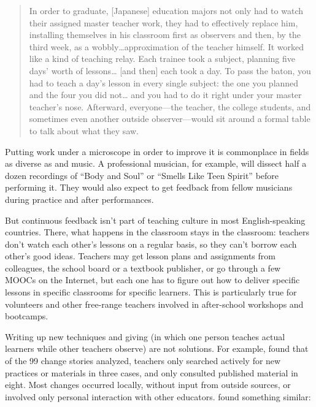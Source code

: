 \begin{quote}

  In order to graduate,
  [Japanese] education majors not only had to watch their assigned master teacher work,
  they had to effectively replace him,
  installing themselves in his classroom first as observers and then,
  by the third week,
  as a wobbly{\ldots}approximation of the teacher himself.
  It worked like a kind of teaching relay.
  Each trainee took a subject,
  planning five days' worth of lessons{\ldots} [and then] each took a day.
  To pass the baton,
  you had to teach a day's lesson in every single subject:
  the one you planned and the four you did not{\ldots}
  and you had to do it right under your master teacher's nose.
  Afterward, everyone---the teacher, the college students,
  and sometimes even another outside observer---would sit around a formal table
  to talk about what they saw.

\end{quote}

Putting work under a microscope in order to improve it is commonplace
in fields as diverse as  and music.
A professional musician,
for example,
will dissect half a dozen recordings of ``Body and Soul'' or ``Smells Like Teen Spirit'' before performing it.
They would also expect to get feedback from fellow musicians during practice and after performances.

But continuous feedback isn't part of teaching culture in most English-speaking countries.
There,
what happens in the classroom stays in the classroom:
teachers don't watch each other's lessons on a regular basis,
so they can't borrow each other's good ideas.
Teachers may get lesson plans and assignments from colleagues,
the school board or a textbook publisher,
or go through a few MOOCs on the Internet,
but each one has to figure out
how to deliver specific lessons in specific classrooms for specific learners.
This is particularly true for volunteers and other free-range teachers
involved in after-school workshops and bootcamps.

Writing up new techniques
and giving 
(in which one person teaches actual learners while other teachers observe)
are not solutions.
For example,
\cite{Finc2007,Finc2012} found that of the 99 change stories analyzed,
teachers only searched actively for new practices or materials in three cases,
and only consulted published material in eight.
Most changes occurred locally,
without input from outside sources,
or involved only personal interaction with other educators.
\cite{Bark2015} found something similar:

